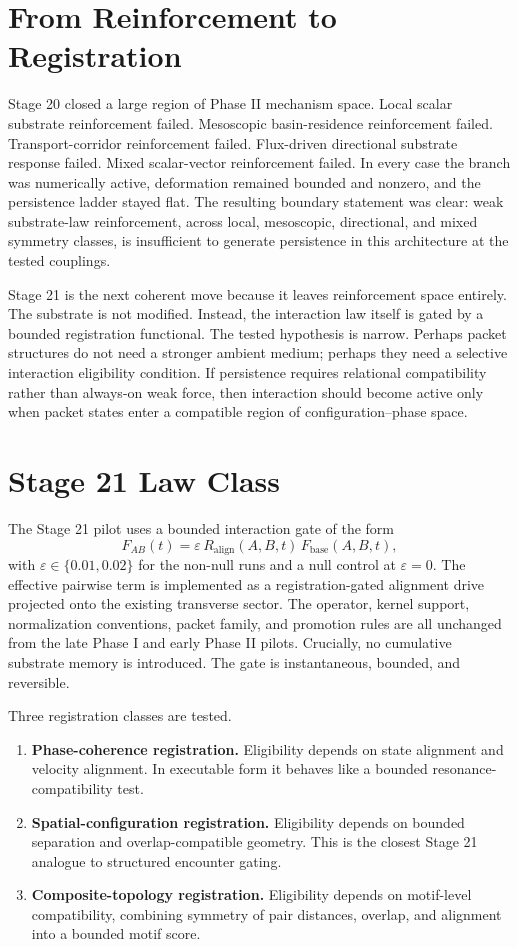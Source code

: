 \documentclass[11pt]{article}
\begin{document}
\section{From Reinforcement to Registration}

Stage 20 closed a large region of Phase II mechanism space. Local scalar substrate reinforcement failed. Mesoscopic basin-residence reinforcement failed. Transport-corridor reinforcement failed. Flux-driven directional substrate response failed. Mixed scalar-vector reinforcement failed. In every case the branch was numerically active, deformation remained bounded and nonzero, and the persistence ladder stayed flat. The resulting boundary statement was clear: weak substrate-law reinforcement, across local, mesoscopic, directional, and mixed symmetry classes, is insufficient to generate persistence in this architecture at the tested couplings.

Stage 21 is the next coherent move because it leaves reinforcement space entirely. The substrate is not modified. Instead, the interaction law itself is gated by a bounded registration functional. The tested hypothesis is narrow. Perhaps packet structures do not need a stronger ambient medium; perhaps they need a selective interaction eligibility condition. If persistence requires relational compatibility rather than always-on weak force, then interaction should become active only when packet states enter a compatible region of configuration--phase space.

\section{Stage 21 Law Class}

The Stage 21 pilot uses a bounded interaction gate of the form
\[
F_{AB}(t)=\varepsilon\,R_{\mathrm{align}}(A,B,t)\,F_{\mathrm{base}}(A,B,t),
\]
with $\varepsilon\in\{0.01,0.02\}$ for the non-null runs and a null control at $\varepsilon=0$. The effective pairwise term is implemented as a registration-gated alignment drive projected onto the existing transverse sector. The operator, kernel support, normalization conventions, packet family, and promotion rules are all unchanged from the late Phase I and early Phase II pilots. Crucially, no cumulative substrate memory is introduced. The gate is instantaneous, bounded, and reversible.

Three registration classes are tested.
\begin{enumerate}
\item \textbf{Phase-coherence registration.} Eligibility depends on state alignment and velocity alignment. In executable form it behaves like a bounded resonance-compatibility test.
\item \textbf{Spatial-configuration registration.} Eligibility depends on bounded separation and overlap-compatible geometry. This is the closest Stage 21 analogue to structured encounter gating.
\item \textbf{Composite-topology registration.} Eligibility depends on motif-level compatibility, combining symmetry of pair distances, overlap, and alignment into a bounded motif score.
\end{enumerate}
\end{document}

